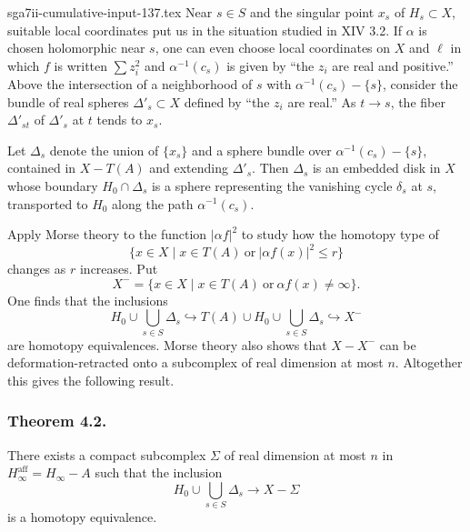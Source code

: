 \begin{filecontents*}{sga7ii-cumulative-input-137.tex}
Near $s\in S$ and the singular point $x_s$ of $H_s\subset X$, suitable
local coordinates put us in the situation studied in XIV 3.2.  If
$\alpha$ is chosen holomorphic near $s$, one can even choose local
coordinates on $X$ and $\ell$ in which $f$ is written
$\sum z_i^2$ and $\alpha^{-1}(c_s)$ is given by ``the $z_i$ are real and
positive.''  Above the intersection of a neighborhood of $s$ with
$\alpha^{-1}(c_s)-\{s\}$, consider the bundle of real spheres
$\Delta'_s\subset X$ defined by ``the $z_i$ are real.''  As $t\to s$, the
fiber $\Delta'_{st}$ of $\Delta'_s$ at $t$ tends to $x_s$.

Let $\Delta_s$ denote the union of $\{x_s\}$ and a sphere bundle over
$\alpha^{-1}(c_s)-\{s\}$, contained in $X-T(A)$ and extending
$\Delta'_s$.  Then $\Delta_s$ is an embedded disk in $X$ whose boundary
$H_0\cap\Delta_s$ is a sphere representing the vanishing cycle $\delta_s$
at $s$, transported to $H_0$ along the path $\alpha^{-1}(c_s)$.

Apply Morse theory to the function $|\alpha f|^2$ to study how the
homotopy type of
\[
 \{x\in X\mid x\in T(A)\ \text{or}\ |\alpha f(x)|^2\leq r\}
\]
changes as $r$ increases.  Put
\[
 X^- = \{x\in X\mid x\in T(A)\ \text{or}\ \alpha f(x)\ne\infty\}.
\]
One finds that the inclusions
\[
 H_0\cup\bigcup_{s\in S}\Delta_s
 \hookrightarrow
 T(A)\cup H_0\cup\bigcup_{s\in S}\Delta_s
 \hookrightarrow X^-
\]
are homotopy equivalences.  Morse theory also shows that $X-X^-$ can be
deformation-retracted onto a subcomplex of real dimension at most $n$.
Altogether this gives the following result.

\subsubsection*{Theorem 4.2.}
There exists a compact subcomplex $\Sigma$ of real dimension at most $n$ in
$H_\infty^{\mathrm{aff}}=H_\infty-A$ such that the inclusion
\[
 H_0\cup\bigcup_{s\in S}\Delta_s\longrightarrow X-\Sigma
\]
is a homotopy equivalence.


\end{filecontents*}
